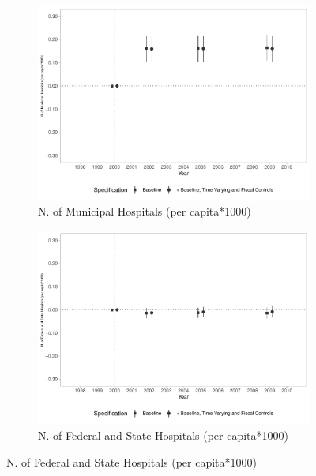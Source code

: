 \begin{figure}[h!]
    \begin{center}
    \caption{Effects on Health Infrastructure}\label{fig:11}
    \begin{subfigure}{0.48\textwidth}
        \caption{\scriptsize N. of Municipal Hospitals (per capita*1000)}\label{fig:11a}
        \centering
\includegraphics[width=\textwidth]{plots/ams_hospital_mun_pcapita_dist_ec29_baseline_dist_ec29_baseline_11.pdf}
    \end{subfigure}
    \begin{subfigure}{0.48\textwidth}
        \centering
        \caption{\scriptsize N. of Federal and State Hospitals (per capita*1000)}\label{fig:11b}
        \includegraphics[width=\textwidth]{plots/ams_hospital_nmun_pcapita_dist_ec29_baseline_dist_ec29_baseline_11.pdf}

\end{subfigure}
\end{center}
\end{figure}
